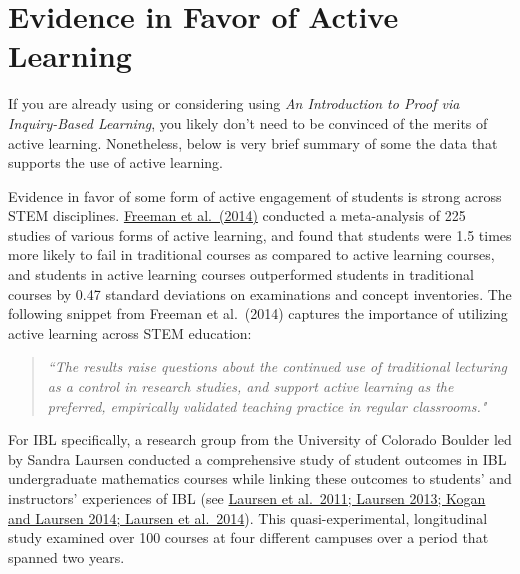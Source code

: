 \documentclass[11pt]{article}%
\newcommand{\blankline}{\pagebreak[2]\vspace{.5\baselineskip}}
\begin{document}

\section*{Evidence in Favor of Active Learning}

If you are already using or considering using \emph{An Introduction to Proof via Inquiry-Based Learning}, you likely don't need to be convinced of the merits of active learning.  Nonetheless, below is very brief summary of some the data that supports the use of active learning.

\blankline

Evidence in favor of some form of active engagement of students is strong across STEM disciplines. \href{https://pubmed.ncbi.nlm.nih.gov/24821756/}{Freeman et al.~(2014)} conducted a meta-analysis of 225 studies of various forms of active learning, and found that students were 1.5 times more likely to fail in traditional courses as compared to active learning courses, and students in active learning courses outperformed students in traditional courses by 0.47 standard deviations on examinations and concept inventories. The following snippet from Freeman et al.~(2014) captures the importance of utilizing active learning across STEM education:
\begin{quote}
\emph{``The results raise questions about the continued use of traditional lecturing as a control in research studies, and support active learning as the preferred, empirically validated teaching practice in regular classrooms."}
\end{quote}

For IBL specifically, a research group from the University of Colorado Boulder led by Sandra Laursen conducted a comprehensive study of student outcomes in IBL undergraduate mathematics courses while linking these outcomes to students' and instructors' experiences of IBL (see \href{https://www.colorado.edu/eer/research-areas/student-centered-stem-education/inquiry-based-learning-college-mathematics}{Laursen et al.~2011; Laursen 2013; Kogan and Laursen 2014; Laursen et al.~2014}). This quasi-experimental, longitudinal study examined over 100 courses at four different campuses over a period that spanned two years.

\blankline
\end{document}
